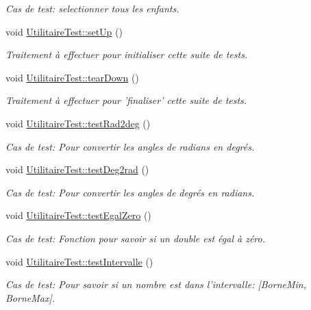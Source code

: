 \begin{DoxyCompactItemize}
\begin{DoxyCompactList}\small\item\em Cas de test\-: selectionner tous les enfants. \end{DoxyCompactList}\item 
void \hyperlink{group__inf2990_ga3a6ce920fe07fe029450c3221592f43e}{Utilitaire\-Test\-::set\-Up} ()
\begin{DoxyCompactList}\small\item\em Traitement à effectuer pour initialiser cette suite de tests. \end{DoxyCompactList}\item 
void \hyperlink{group__inf2990_gac4dc695e75bf75295e629e73cb55abf0}{Utilitaire\-Test\-::tear\-Down} ()
\begin{DoxyCompactList}\small\item\em Traitement à effectuer pour 'finaliser' cette suite de tests. \end{DoxyCompactList}\item 
void \hyperlink{group__inf2990_ga99986aa1af0f2f7eba4f0854bd44496b}{Utilitaire\-Test\-::test\-Rad2deg} ()
\begin{DoxyCompactList}\small\item\em Cas de test\-: Pour convertir les angles de radians en degrés. \end{DoxyCompactList}\item 
void \hyperlink{group__inf2990_gac029f9bee013cf1991a4b5922515c00b}{Utilitaire\-Test\-::test\-Deg2rad} ()
\begin{DoxyCompactList}\small\item\em Cas de test\-: Pour convertir les angles de degrés en radians. \end{DoxyCompactList}\item 
void \hyperlink{group__inf2990_ga82ce5c8ba751ce2773389fc98448718c}{Utilitaire\-Test\-::test\-Egal\-Zero} ()
\begin{DoxyCompactList}\small\item\em Cas de test\-: Fonction pour savoir si un double est égal à zéro. \end{DoxyCompactList}\item 
void \hyperlink{group__inf2990_ga5c34fe0b98799c5820e2c4f54e689d98}{Utilitaire\-Test\-::test\-Intervalle} ()
\begin{DoxyCompactList}\small\item\em Cas de test\-: Pour savoir si un nombre est dans l'intervalle\-: \mbox{[}Borne\-Min, Borne\-Max\mbox{]}. \end{DoxyCompactList}\end{DoxyCompactItemize}

